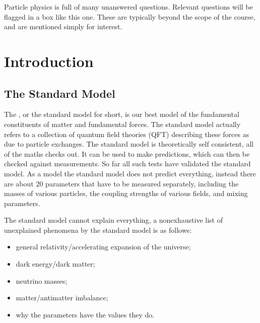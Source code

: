 \documentclass[fleqn]{NotesClass}
\begin{document}
    \begin{openquestion}{}{}
        Particle physics is full of many unanswered questions.
        Relevant questions will be flagged in a box like this one.
        These are typically beyond the scope of the course, and are mentioned simply for interest.
    \end{openquestion}
        
    \chapter{Introduction}
    \section{The Standard Model}
    The , or the standard model for short, is our best model of the fundamental constituents of matter and fundamental forces.
    The standard model actually refers to a collection of quantum field theories (QFT) describing these forces as due to particle exchanges.
    The standard model is theoretically self consistent, all of the maths checks out.
    It can be used to make predictions, which can then be checked against measurements.
    So far all such tests have validated the standard model.
    As a model the standard model does not predict everything, instead there are about 20 parameters that have to be measured separately, including the masses of various particles, the coupling strengths of various fields, and mixing parameters.
    
    The standard model cannot explain everything, a nonexhaustive list of unexplained phenomena by the standard model is as follows:
    \begin{itemize}
        \item general relativity/accelerating expansion of the universe;
        \item dark energy/dark matter;
        \item neutrino masses;
        \item matter/antimatter imbalance;
        \item why the parameters have the values they do.
    \end{itemize}
    
\end{document}

